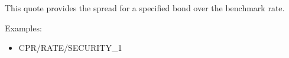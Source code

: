 This quote provides the spread for a specified bond over the benchmark rate.

\medskip
Examples:
\begin{itemize}
	\item CPR/RATE/SECURITY\_1
\end{itemize}





